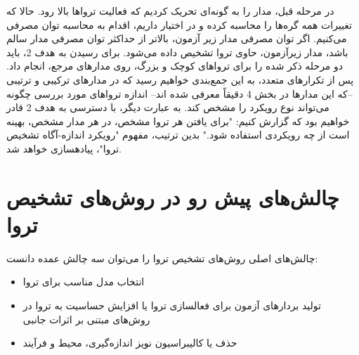 در مرحله قبل، مدار را به گونه‌ای تحریک کردیم که فعالیت تروا‌ها بالا رود. حالا که تغییرات همه گره‌ها را محاسبه کرده و در اختیار داریم، اقدام به محاسبه توان مصرفی می‌کنیم. اگر توان مصرفی مدار زیر آزمون، بالاتر از حداکثر توان مصرفی مدار سالم باشد، مدار زیرآزمون، حاوی تروا تشخیص داده می‌شود. 
برای رسیدن به هدف 2، باید دو مرحله ذکر شده را برای تروا‌های کوچک و بزرگ، روی مدارهای مرجع، انجام داد. پس از تکرارهای متعدد، به این جمع‌بندی خواهیم رسید که در مدارهای ترکیبی و ترتیبی --که این مدارها در بخش 4 دقیقاً معرفی شده اند-- اندازه تروا‌‌های مورد بررسی چگونه می‌تواند نوع رویکرد را مشخص کند. به عبارت دیگر، با دسترسی به هدف 2 قادر خواهیم بود که گزارش کنیم: "برای یافتن هر تروا مشخص، در هر مدار مشخص، بهینه است از چه رویکردی استفاده شود."
بدین ترتیب، مفهوم "رویکرد اندازه-آگاه تشخیص تروا"، پیادهسازی خواهد شد.
\section {چالش‌های پیش رو در روش‌های تشخیص تروا}
چالش‌های اصلی روش‌های تشخیص تروا را می‌توان سه چالش عمده دانست:
\begin{itemize}
	\item انتخاب مدل مناسب برای تروا
	\item تولید بردارهای آزمون برای فعالسازی تروا یا افزایش حساسیت به تروا در روش‌های مبتنی بر اثرات جانبی
	\item حذف یا کالیبراسیون نویز اندازه‌گیری، محیط و فرآیند
\end{itemize}
